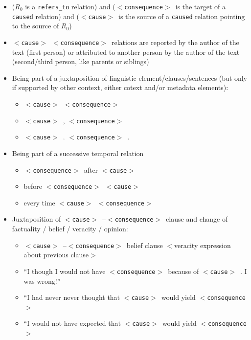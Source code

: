 \documentclass[12pt]{article}
\theoremstyle{definition}
\newcommand{\cause}{$<$\texttt{cause}$>$\ }
\newcommand{\conseq}{$<$\texttt{consequence}$>$\ }
\begin{document}
\begin{itemize}
\begin{itemize}
        \item \cause is correlated with \conseq and \cause is preceding \conseq
        \item \cause is probably linked with \conseq and \cause is preceding \conseq
    \end{itemize}
    \item ($R_0$ is a \texttt{refers\_to} relation) and (\conseq is the target of a \texttt{caused} relation) and (\cause is the source of a \texttt{caused} relation pointing  to the source of $R_0$)
    \item \cause \conseq relations are reported by the author of the text (first person) or attributed to another person by the author of the text (second/third person, like parents or siblings)
    \item Being part of a juxtaposition of linguistic element/clauses/sentences (but only if supported by other context, either cotext and/or metadata elements):
    \begin{itemize}
        \item \cause \conseq
        \item \cause, \conseq
        \item \cause. \conseq.
    \end{itemize}
    \item Being part of a successive temporal relation
    \begin{itemize}
        \item \conseq after \cause
        \item before \conseq \cause
        \item every time \cause \conseq
    \end{itemize}
    \item Juxtaposition of \cause--\conseq clause and change of factuality / belief / veracity / opinion:
    \begin{itemize}
        \item \cause--\conseq belief clause  $<$veracity expression about previous clause$>$
        \item ``I though I would not have \conseq because of \cause. I was wrong!''
        \item ``I had never never thought that \cause would yield \conseq
        \item ``I would not have expected that \cause would yield \conseq
    \end{itemize}


 
\end{itemize}
\end{document}
